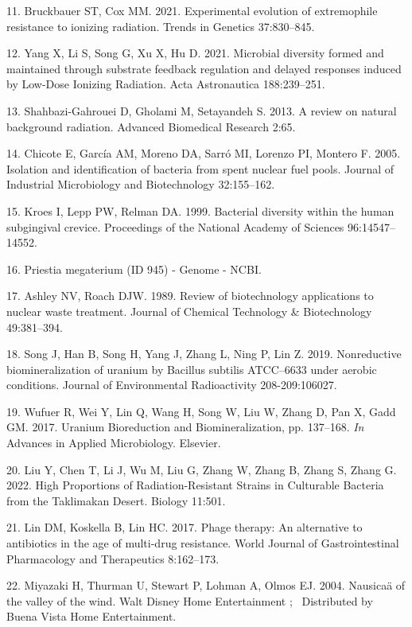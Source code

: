 \documentclass[12pt,twoside]{reedthesis}
\begin{document}
\leavevmode\hypertarget{ref-bruckbauer_experimental_2021}{}%
11. Bruckbauer ST, Cox MM. 2021. Experimental evolution of extremophile resistance to ionizing radiation. Trends in Genetics 37:830--845.

\leavevmode\hypertarget{ref-yang_microbial_2021}{}%
12. Yang X, Li S, Song G, Xu X, Hu D. 2021. Microbial diversity formed and maintained through substrate feedback regulation and delayed responses induced by Low-Dose Ionizing Radiation. Acta Astronautica 188:239--251.

\leavevmode\hypertarget{ref-shahbazi-gahrouei_review_2013}{}%
13. Shahbazi-Gahrouei D, Gholami M, Setayandeh S. 2013. A review on natural background radiation. Advanced Biomedical Research 2:65.

\leavevmode\hypertarget{ref-chicote_isolation_2005}{}%
14. Chicote E, García AM, Moreno DA, Sarró MI, Lorenzo PI, Montero F. 2005. Isolation and identification of bacteria from spent nuclear fuel pools. Journal of Industrial Microbiology and Biotechnology 32:155--162.

\leavevmode\hypertarget{ref-kroes_bacterial_1999}{}%
15. Kroes I, Lepp PW, Relman DA. 1999. Bacterial diversity within the human subgingival crevice. Proceedings of the National Academy of Sciences 96:14547--14552.

\leavevmode\hypertarget{ref-noauthor_priestia_nodate}{}%
16. Priestia megaterium (ID 945) - Genome - NCBI.

\leavevmode\hypertarget{ref-ashley_review_1989}{}%
17. Ashley NV, Roach DJW. 1989. Review of biotechnology applications to nuclear waste treatment. Journal of Chemical Technology \& Biotechnology 49:381--394.

\leavevmode\hypertarget{ref-song_nonreductive_2019}{}%
18. Song J, Han B, Song H, Yang J, Zhang L, Ning P, Lin Z. 2019. Nonreductive biomineralization of uranium by Bacillus subtilis ATCC--6633 under aerobic conditions. Journal of Environmental Radioactivity 208-209:106027.

\leavevmode\hypertarget{ref-wufuer_uranium_2017}{}%
19. Wufuer R, Wei Y, Lin Q, Wang H, Song W, Liu W, Zhang D, Pan X, Gadd GM. 2017. Uranium Bioreduction and Biomineralization, pp. 137--168. \emph{In} Advances in Applied Microbiology. Elsevier.

\leavevmode\hypertarget{ref-liu_high_2022}{}%
20. Liu Y, Chen T, Li J, Wu M, Liu G, Zhang W, Zhang B, Zhang S, Zhang G. 2022. High Proportions of Radiation-Resistant Strains in Culturable Bacteria from the Taklimakan Desert. Biology 11:501.

\leavevmode\hypertarget{ref-lin_phage_2017}{}%
21. Lin DM, Koskella B, Lin HC. 2017. Phage therapy: An alternative to antibiotics in the age of multi-drug resistance. World Journal of Gastrointestinal Pharmacology and Therapeutics 8:162--173.

\leavevmode\hypertarget{ref-miyazaki_nausicaa_2004}{}%
22. Miyazaki H, Thurman U, Stewart P, Lohman A, Olmos EJ. 2004. Nausicaä of the valley of the wind. Walt Disney Home Entertainment ; ~Distributed by Buena Vista Home Entertainment.


\end{document}
